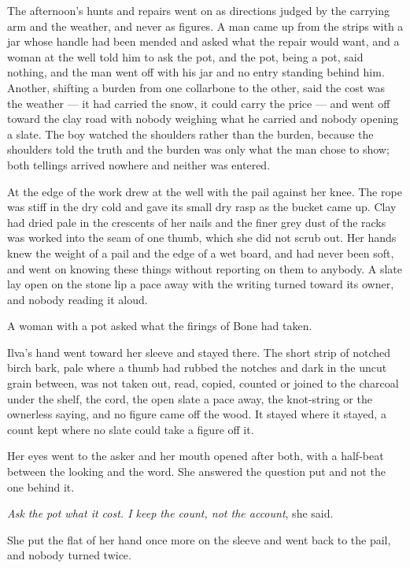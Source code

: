 The afternoon's hunts and repairs went on as directions judged by the carrying arm and the weather, and never as figures. A man came up from the strips with a jar whose handle had been mended and asked what the repair would want, and a woman at the well told him to ask the pot, and the pot, being a pot, said nothing, and the man went off with his jar and no entry standing behind him. Another, shifting a burden from one collarbone to the other, said the cost was the weather --- it had carried the snow, it could carry the price --- and went off toward the clay road with nobody weighing what he carried and nobody opening a slate. The boy watched the shoulders rather than the burden, because the shoulders told the truth and the burden was only what the man chose to show; both tellings arrived nowhere and neither was entered.

\scenebreak

At the edge of the work  drew at the well with the pail against her knee. The rope was stiff in the dry cold and gave its small dry rasp as the bucket came up. Clay had dried pale in the crescents of her nails and the finer grey dust of the racks was worked into the seam of one thumb, which she did not scrub out. Her hands knew the weight of a pail and the edge of a wet board, and had never been soft, and went on knowing these things without reporting on them to anybody. A slate lay open on the stone lip a pace away with the writing turned toward its owner, and nobody reading it aloud.

A woman with a pot asked what the firings of Bone had taken.

Ilva's hand went toward her sleeve and stayed there. The short strip of notched birch bark, pale where a thumb had rubbed the notches and dark in the uncut grain between, was not taken out, read, copied, counted or joined to the charcoal under the shelf, the cord, the open slate a pace away, the knot-string or the ownerless saying, and no figure came off the wood. It stayed where it stayed, a count kept where no slate could take a figure off it.

Her eyes went to the asker and her mouth opened after both, with a half-beat between the looking and the word. She answered the question put and not the one behind it.

\emph{Ask the pot what it cost. I keep the count, not the account}, she said.

She put the flat of her hand once more on the sleeve and went back to the pail, and nobody turned twice.

